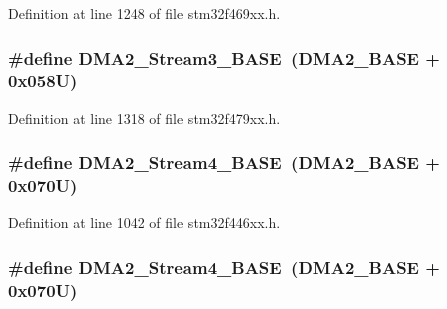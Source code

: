 Definition at line 1248 of file stm32f469xx.\+h.

\subsubsection[{\texorpdfstring{D\+M\+A2\+\_\+\+Stream3\+\_\+\+B\+A\+SE}{DMA2_Stream3_BASE}}]{\setlength{\rightskip}{0pt plus 5cm}\#define D\+M\+A2\+\_\+\+Stream3\+\_\+\+B\+A\+SE~({\bf D\+M\+A2\+\_\+\+B\+A\+SE} + 0x058\+U)}\hypertarget{group___peripheral__memory__map_gaf3a9480e08c6ae94f4482e0cdaebdd17}{}\label{group___peripheral__memory__map_gaf3a9480e08c6ae94f4482e0cdaebdd17}


Definition at line 1318 of file stm32f479xx.\+h.

\subsubsection[{\texorpdfstring{D\+M\+A2\+\_\+\+Stream4\+\_\+\+B\+A\+SE}{DMA2_Stream4_BASE}}]{\setlength{\rightskip}{0pt plus 5cm}\#define D\+M\+A2\+\_\+\+Stream4\+\_\+\+B\+A\+SE~({\bf D\+M\+A2\+\_\+\+B\+A\+SE} + 0x070\+U)}\hypertarget{group___peripheral__memory__map_gad1e67740e6301233473f64638145dd1f}{}\label{group___peripheral__memory__map_gad1e67740e6301233473f64638145dd1f}


Definition at line 1042 of file stm32f446xx.\+h.

\subsubsection[{\texorpdfstring{D\+M\+A2\+\_\+\+Stream4\+\_\+\+B\+A\+SE}{DMA2_Stream4_BASE}}]{\setlength{\rightskip}{0pt plus 5cm}\#define D\+M\+A2\+\_\+\+Stream4\+\_\+\+B\+A\+SE~({\bf D\+M\+A2\+\_\+\+B\+A\+SE} + 0x070\+U)}\hypertarget{group___peripheral__memory__map_gad1e67740e6301233473f64638145dd1f}{}\label{group___peripheral__memory__map_gad1e67740e6301233473f64638145dd1f}


